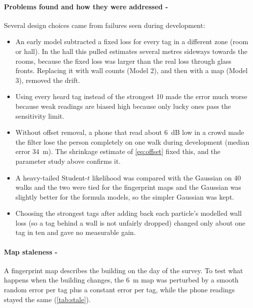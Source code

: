 \documentclass[11pt,a4paper]{article}
\begin{document}
\paragraph{Problems found and how they were addressed -} Several design choices came from
failures seen during development:
\begin{itemize}
  \item An early model subtracted a fixed loss for every tag in a different zone (room
        or hall). In the hall this pulled estimates several metres sideways towards the
        rooms, because the fixed loss was larger than the real loss through glass fronts.
        Replacing it with wall counts (Model 2), and then with a map (Model 3), removed
        the drift.
  \item Using every heard tag instead of the strongest 10 made the error much worse because
        weak readings are biased high because only lucky ones pass the sensitivity limit.
  \item Without offset removal, a phone that read about \SI{6}{dB} low in a crowd made
        the filter lose the person completely on one walk during development
        (median error \SI{34}{m}). The shrinkage estimate of \cref{eq:offset} fixed this,
        and the parameter study above confirms it.
  \item A heavy-tailed Student-$t$ likelihood was compared with the Gaussian on 40 walks and
        the two were tied for the fingerprint maps and the Gaussian was slightly better
        for the formula models, so the simpler Gaussian was kept.
  \item Choosing the strongest tags after adding back each particle's modelled wall
        loss (so a tag behind a wall is not unfairly dropped) changed only about one tag
        in ten and gave no measurable gain.
\end{itemize}

\paragraph{Map staleness -} A fingerprint map describes the building on the day of the
survey. To test what happens when the building changes, the \SI{6}{m} map was perturbed
by a smooth random error per tag plus a constant error per tag, while the phone readings
stayed the same (\cref{tab:stale}).
\end{document}
